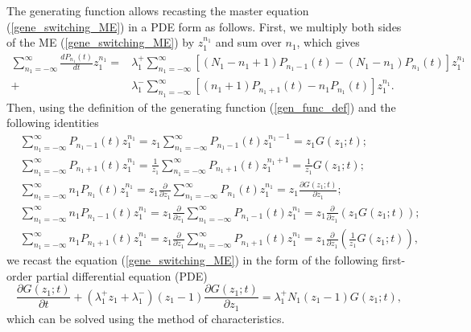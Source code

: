 \documentclass[a4paper, 11pt]{article}
\begin{document}
The generating function allows recasting the master equation (\ref{gene_switching_ME}) in a PDE form as follows. First, we multiply both sides of the ME (\ref{gene_switching_ME}) by $z_1^{n_1}$ and sum over $n_1$, which gives
\begin{equation*}
  \begin{split}
    \sum_{n_1=-\infty}^{\infty}\frac{dP_{n_1}(t)}{dt}z_1^{n_1} = &\lambda_1^+\sum_{n_1=-\infty}^{\infty}\left[(N_1-n_1+1)P_{n_1-1}(t) - (N_1-n_1)P_{n_1}(t)\right]z_1^{n_1}\\
    + & \lambda_1^-\sum_{n_1=-\infty}^{\infty}\left[(n_1+1)P_{n_1+1}(t) - n_1P_{n_1}(t)\right]z_1^{n_1}.
  \end{split}
\end{equation*}
Then, using the definition of the generating function (\ref{gen_func_def}) and the following identities
\begin{align*}
  & \sum_{n_1=-\infty}^{\infty}P_{n_1-1}(t)z_1^{n_1} = z_1\sum_{n_1=-\infty}^{\infty}P_{n_1-1}(t)z_1^{n_1-1} = z_1G(z_1;t);\\
  & \sum_{n_1=-\infty}^{\infty}P_{n_1+1}(t)z_1^{n_1} = \frac{1}{z_1}\sum_{n_1=-\infty}^{\infty}P_{n_1+1}(t)z_1^{n_1+1} = \frac{1}{z_1}G(z_1;t);\\
  & \sum_{n_1=-\infty}^{\infty}n_1P_{n_1}(t)z_1^{n_1} = z_1\frac{\partial}{\partial z_1}\sum_{n_1=-\infty}^{\infty}P_{n_1}(t)z_1^{n_1} = z_1\frac{\partial G(z_1; t)}{\partial z_1};\\
  & \sum_{n_1=-\infty}^{\infty}n_1P_{n_1-1}(t)z_1^{n_1} = z_1\frac{\partial}{\partial z_1}\sum_{n_1=-\infty}^{\infty}P_{n_1-1}(t)z_1^{n_1} = z_1\frac{\partial}{\partial z_1} \left(z_1G(z_1; t)\right);\\
  & \sum_{n_1=-\infty}^{\infty}n_1P_{n_1+1}(t)z_1^{n_1} = z_1\frac{\partial}{\partial z_1}\sum_{n_1=-\infty}^{\infty}P_{n_1+1}(t)z_1^{n_1} = z_1\frac{\partial}{\partial z_1} \left(\frac{1}{z_1}G(z_1; t)\right),
\end{align*}
we recast the equation (\ref{gene_switching_ME}) in the form of the following first-order partial differential equation (PDE)
\begin{equation*} \label{gene_switching_PDE}
  \frac{\partial G(z_1;t)}{\partial t} + (\lambda_1^+z_1 + \lambda_1^-)(z_1-1)\frac{\partial G(z_1;t)}{\partial z_1} = \lambda_1^+N_1(z_1-1)G(z_1;t),
\end{equation*}
which can be solved using the method of characteristics.
\end{document}
